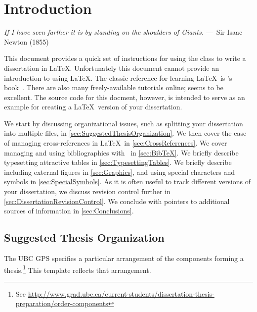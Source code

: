 
\chapter{Introduction}
\label{ch:Introduction}

\begin{epigraph}
    \emph{If I have seen farther it is by standing on the shoulders of
    Giants.} ---~Sir Isaac Newton (1855)
\end{epigraph}

This document provides a quick set of instructions for using the
 class to write a dissertation in \LaTeX. 
Unfortunately this document cannot provide an introduction to using
\LaTeX.  The classic reference for learning \LaTeX\ is
\citeauthor{lamport-1994-ladps}'s
book~\cite{lamport-1994-ladps}.  There are also many freely-available
tutorials online;
seems to be excellent.
The source code for this docment, however, is intended to serve as
an example for creating a \LaTeX\ version of your dissertation.

We start by discussing organizational issues, such as splitting
your dissertation into multiple files, in
\autoref{sec:SuggestedThesisOrganization}.
We then cover the ease of managing cross-references in \LaTeX\ in
\autoref{sec:CrossReferences}.
We cover managing and using bibliographies with \BibTeX\ in
\autoref{sec:BibTeX}. 
We briefly describe typesetting attractive tables in
\autoref{sec:TypesettingTables}.
We briefly describe including external figures in
\autoref{sec:Graphics}, and using special characters and symbols
in \autoref{sec:SpecialSymbols}.
As it is often useful to track different versions of your dissertation,
we discuss revision control further in
\autoref{sec:DissertationRevisionControl}. 
We conclude with pointers to additional sources of information in
\autoref{sec:Conclusions}.

\section{Suggested Thesis Organization}
\label{sec:SuggestedThesisOrganization}

The \acs{UBC} \acf{GPS} specifies a particular arrangement of the
components forming a thesis.\footnote{See
    \url{http://www.grad.ubc.ca/current-students/dissertation-thesis-preparation/order-components}}
This template reflects that arrangement.

